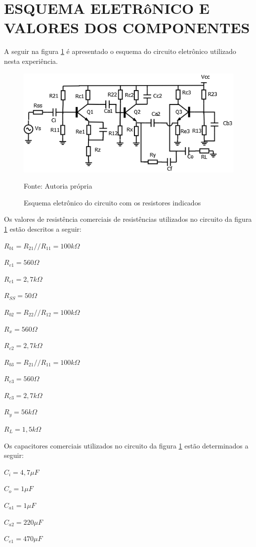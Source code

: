 \documentclass[openright]{normas-utf-tex} %
\begin{document}
\section{ESQUEMA ELETRôNICO E VALORES DOS COMPONENTES}
\label{sec:esquema_comp}
A seguir na figura \ref{fig:circuito1} é apresentado o esquema do circuito eletrônico utilizado nesta experiência.
\begin{figure}[H]
\centering
\includegraphics[width=0.75\linewidth]{img/CircuitoComRealimenta.png}
\caption{Esquema eletrônico do circuito com os resistores indicados}
Fonte: Autoria própria
\label{fig:circuito1}
\end{figure}

Os valores de resistência comerciais de resistências utilizados no circuito da figura \ref{fig:circuito1} estão descritos a seguir:

$ R_{b1} = R_{21}//R_{11} = 100 k\Omega$

$R_{e1} = 560 \Omega$

$R_{c1} = 2,7 k\Omega$

$R_{SS} = 50 \Omega$

$ R_{b2} = R_{22}//R_{12} = 100 k\Omega$

$R_{x} = 560 \Omega$

$R_{c2} = 2,7 k\Omega$

$ R_{b3} = R_{21}//R_{11} = 100 k\Omega$

$R_{e3} = 560 \Omega$

$R_{c3} = 2,7 k\Omega$

$R_{y} = 56 k\Omega$

$R_{L} = 1,5 k\Omega$


Os capacitores comerciais utilizados no circuito da figura \ref{fig:circuito1} estão determinados a seguir:

$C_i = 4,7  \mu F$

$C_o = 1 \mu F$

$C_{a1} = 1 \mu F$

$C_{a2} = 220 \mu F$

$C_{e1} = 470 \mu F$
\end{document}
